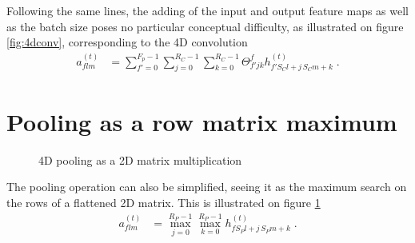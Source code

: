 \begin{subappendices}
Following the same lines, the adding of the input and output feature maps as well as the batch size poses no particular conceptual difficulty, as illustrated on figure \ref{fig:4dconv}, corresponding to the 4D convolution
\begin{align}
a^{(t)}_{flm}&=
%
\sum_{f'=0}^{F_p-1}\sum_{j=0}^{R_C-1}\sum_{k=0}^{R_C-1}\Theta^f_{f'jk}h^{(t)}_{f'S_Cl+j\,S_Cm+k}\;.
\end{align}


\section{Pooling as a row matrix maximum}

\begin{figure}[H]
\begin{center}
\caption{\label{fig:4dpool}4D pooling as a 2D matrix multiplication}
\end{center}
\end{figure}

The pooling operation can also be simplified, seeing it as the maximum search on the rows of a flattened 2D matrix. This is illustrated on figure \ref{fig:4dpool}
\begin{align}
a^{(t)}_{flm}&=
%
\max_{j=0}^{R_P-1}\max_{k=0}^{R_P-1}h^{(t)}_{fS_Pl+j\,S_Pm+k}\;.
\end{align}
\end{subappendices}
